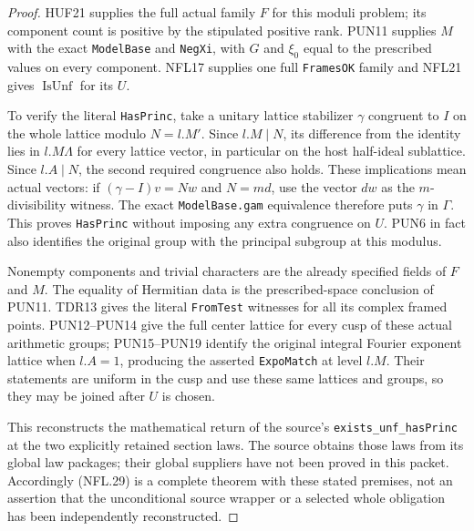 \documentclass[11pt,a4paper]{article}
\numberwithin{equation}{section}
\theoremstyle{remark}\newtheorem{remark}[theorem]{Remark}
\begin{document}
\begin{proof}
HUF21 supplies the full actual family $F$ for this moduli
problem; its component count is positive by the stipulated
positive rank.  PUN11 supplies $M$ with the exact
\texttt{Model\allowbreak Base} and \texttt{Neg\allowbreak Xi}, with $G$ and $\xi_0$
equal to the prescribed values on every component.  NFL17
supplies one full \texttt{Frames\allowbreak OK} family and NFL21 gives
$\operatorname{IsUnf}$ for its $U$.

To verify the literal \texttt{Has\allowbreak Princ}, take a unitary lattice
stabilizer $\gamma$ congruent to $I$ on the whole lattice
modulo $N=l.M'$.  Since $l.M\mid N$, its difference from
the identity lies in $l.M\Lambda$ for every lattice vector,
in particular on the host half-ideal sublattice.  Since
$l.A\mid N$, the second required congruence also holds.
These implications mean actual vectors: if
$(\gamma-I)v=Nw$ and $N=md$, use the vector $dw$ as the
$m$-divisibility witness.  The exact \texttt{Model\allowbreak Base.\allowbreak gam}
equivalence therefore puts $\gamma$ in $\Gamma$.
This proves \texttt{Has\allowbreak Princ} without imposing any extra
congruence on $U$.  PUN6 in fact also identifies the original
group with the principal subgroup at this modulus.

Nonempty components and trivial characters are the already
specified fields of $F$ and $M$.  The equality of Hermitian
data is the prescribed-space conclusion of PUN11.  TDR13
gives the literal \texttt{From\allowbreak Test} witnesses for all its
complex framed points.  PUN12--PUN14 give the full center
lattice for every cusp of these actual arithmetic groups;
PUN15--PUN19 identify the original integral Fourier exponent
lattice when $l.A=1$, producing the asserted
\texttt{Expo\allowbreak Match} at level $l.M$.  Their statements are
uniform in the cusp and use these same lattices and groups,
so they may be joined after $U$ is chosen.

This reconstructs the mathematical return of the source's
\texttt{exists\_\allowbreak unf\_\allowbreak has\allowbreak Princ} at the two explicitly retained
section laws.  The source obtains those laws from its global
law packages; their global suppliers have not been proved in
this packet.  Accordingly (NFL.29) is a complete theorem
with these stated premises, not an assertion that the
unconditional source wrapper or a selected whole obligation
has been independently reconstructed.
\end{proof}
\end{document}
